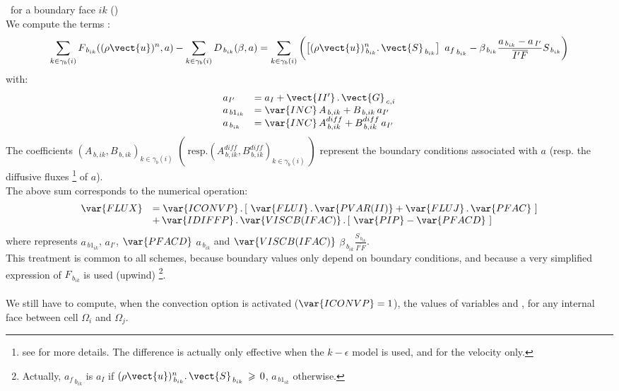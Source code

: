 \hspace*{1cm}{\tiny$\blacksquare$}\, for a boundary face $ik$ ()\\
We compute the terms :
\begin{equation}\notag
\sum_{k\in {\gamma_b(i)}} {F_{\,{b}_{ik}}((\rho \vect{u})^n,a)}
- \sum_{k\in {\gamma_b(i)}} {D_{\,{b}_{ik}}(\beta, a)}
=\sum_{k\in {\gamma_b(i)}}\displaystyle\left(\left[{(\rho
\vect{u})_{\,{b}_{ik}}^n} \text{.}\, \vect{S}_{\,{b}_{ik}}\right]\
{a_f}_{\,{b}_{ik}}- \beta_{\,b_{ik}}
\frac{a_{\,b_{ik}}-a_{\,I'}}{\overline{I'F}} S_{\,b_{ik}}\right)
\end{equation}
with:
\begin{equation}\notag
\begin{array}{lll}
a_{I'}& = a_I + \vect{II'}\,.\,\vect{G}_{\,c,i}\\
a_{\,{b1}_{ik}} &= \var{INC}\,A_{\,b,ik} + B_{\,b,ik}\,a_{I'}\\
a_{\,b_{ik}}& = \var{INC}\,A^{diff}_{\,b,ik} + B^{diff}_{\,b,ik}\,a_{I'}\\
\end{array}
\end{equation}
The coefficients $( A_{\,b,ik}, B_{\,b,ik} )_{k\in {\gamma_b(i)}}$ $\left(\ \text{resp.} ( A^{diff}_{\,b,ik}, B^{diff}_{\,b,ik} )_{k\in
{\gamma_b(i)}}\ \right)$ represent the boundary conditions associated with
$a$ (resp. the diffusive fluxes \footnote { see 
 for more details. The difference is actually only effective when the $k-\epsilon$ model is used, and for the velocity only.} of $a$).\\
The above sum corresponds to the numerical operation:
\begin{equation}\label{Base_Bilsc2_eq_flux_bord}
\begin{array}{ll}
\var{FLUX}& = \var{ICONVP} \,.\,[\ \var{FLUI}\,.\, \var{PVAR(II)} + \var{FLUJ}\,.\, \var{PFAC}\ ]\\
&+\,\var{IDIFFP}\,.\,\var{VISCB(IFAC)}\,.\,[\ \var{PIP} - \var{PFACD}\ ]
\end{array}
\end{equation}
where  represents $a_{\,{b1}_{ik}}$,  $a_{I'}$, $\var{PFACD}$ $a_{\,b_{ik}}$ and $\var{VISCB(IFAC)}$
$ \beta_{\,b_{ik}} \displaystyle\frac{S_{\,b_{ik}}}{\overline{I'F}} $.\\
This treatment is common to all schemes, because boundary values only depend on boundary conditions, and because a very simplified expression of $F_{\,{b}_{ik}}$ is used (upwind)
\footnote{Actually, ${a_f}_{\,{b}_{ik}}$ is $a_I$ if  ${(\rho
\vect{u})_{\,{b}_{ik}}^n} \text{.}\, \vect{S}_{\,{b}_{ik}}\,\geqslant \,0$, $a_{\,{b1}_{ik}}$ otherwise.}.\\\\
We still have to compute, when the convection option is activated ($\var{ICONVP} = 1$), 
the values of variables \var{PIF} and
, for any internal face  between cell 
$\Omega_i$  and $\Omega_j$.
